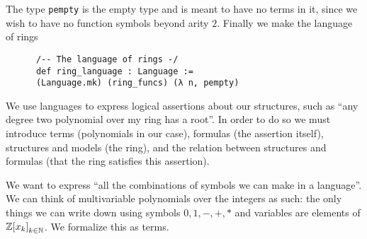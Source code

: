 \begin{dfn}
    The type \texttt{pempty} is the empty type and is meant to have no terms in it,
    since we wish to have no function symbols beyond arity $2$.
    Finally we make the language of rings

    \begin{lstlisting}
      /-- The language of rings -/
      def ring_language : Language :=
      (Language.mk) (ring_funcs) (λ n, pempty)\end{lstlisting}

\end{dfn}

We use languages to express logical assertions about our structures, such as
``any degree two polynomial over my ring has a root''.
In order to do so we must introduce terms (polynomials in our case),
formulas (the assertion itself), structures and models (the ring),
and the relation between structures and formulas
(that the ring satisfies this assertion).

We want to express ``all the combinations of symbols we can make in a language''.
We can think of multivariable polynomials over the integers as such:
the only things we can write down using symbols $0,1,-,+,*$ and variables
are elements of $\mathbb{Z}{[x_{k}]}_{k \in \mathbb{N}}$.
We formalize this as terms.

